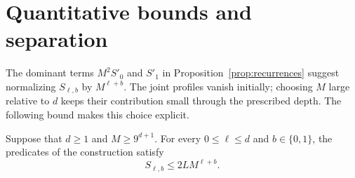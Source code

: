 \section{Quantitative bounds and separation}
\label{sec:separation}

The dominant terms $M^2S'_0$ and $S'_1$ in
Proposition~\ref{prop:recurrences} suggest normalizing $S_{\ell,b}$ by
$M^{\ell+b}$. The joint profiles vanish initially; choosing $M$ large
relative to $d$ keeps their contribution small through the prescribed
depth. The following bound makes this choice explicit.

\begin{lemma}
\label{lem:quantitative-profiles}
Suppose that $d\geq 1$ and $M\geq 9^{d+1}$.
For every $0\leq\ell\leq d$ and $b\in\{0,1\}$, the predicates of the
construction satisfy
\[
  S_{\ell,b}\leq 2L M^{\ell+b}.
\]
\end{lemma}

